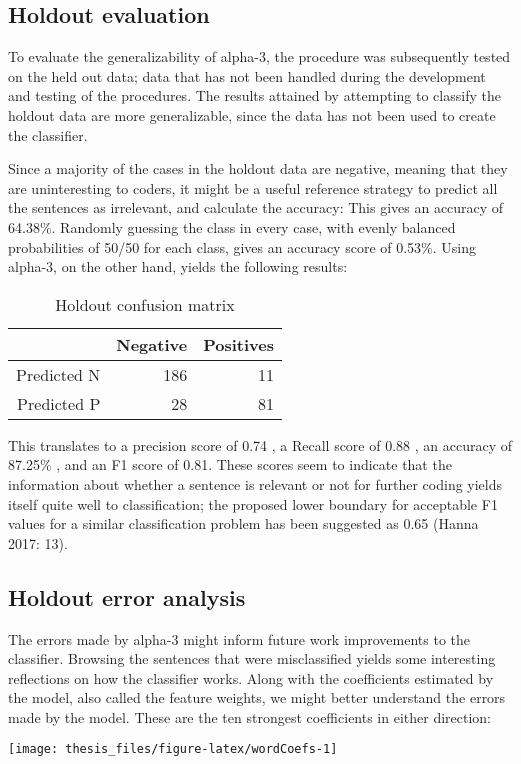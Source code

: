 \documentclass[12pt,twoside]{reedthesis}
\begin{document}
\subsection{Holdout evaluation}\label{holdout-evaluation}

To evaluate the generalizability of alpha-3, the procedure was
subsequently tested on the held out data; data that has not been handled
during the development and testing of the procedures. The results
attained by attempting to classify the holdout data are more
generalizable, since the data has not been used to create the
classifier.

Since a majority of the cases in the holdout data are negative, meaning
that they are uninteresting to coders, it might be a useful reference
strategy to predict all the sentences as irrelevant, and calculate the
accuracy: This gives an accuracy of 64.38\%. Randomly guessing the class
in every case, with evenly balanced probabilities of 50/50 for each
class, gives an accuracy score of 0.53\%. Using alpha-3, on the other
hand, yields the following results:\newline
\begin{table}[ht]
\centering
\begin{tabular}{rrr}
  \hline
 & Negative & Positives \\ 
  \hline
Predicted N & 186 &  11 \\ 
  Predicted P &  28 &  81 \\ 
   \hline
\end{tabular}
\caption{Holdout confusion matrix} 
\end{table}
\newline
This translates to a precision score of 0.74 , a Recall score of 0.88 ,
an accuracy of 87.25\% , and an F1 score of 0.81. These scores seem to
indicate that the information about whether a sentence is relevant or
not for further coding yields itself quite well to classification; the
proposed lower boundary for acceptable F1 values for a similar
classification problem has been suggested as 0.65 (Hanna 2017: 13).

\subsection{Holdout error analysis}\label{holdout-error-analysis}

The errors made by alpha-3 might inform future work improvements to the
classifier. Browsing the sentences that were misclassified yields some
interesting reflections on how the classifier works. Along with the
coefficients estimated by the model, also called the feature weights, we
might better understand the errors made by the model. These are the ten
strongest coefficients in either direction:
\begin{flushleft}\texttt{[image: thesis\_files/figure-latex/wordCoefs-1]} \end{flushleft}
\end{document}
